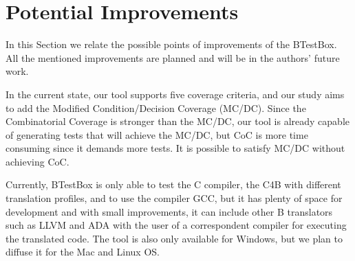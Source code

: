 \documentclass[runningheads]{llncs}
\begin{document}

\section{Potential Improvements}

In this Section we relate the possible points of improvements of the BTestBox. All the mentioned improvements are planned and will be in the authors' future work.

In the current state, our tool supports five coverage criteria, and our study aims to add the Modified Condition/Decision Coverage (MC/DC). Since the Combinatorial Coverage is stronger than the MC/DC, our tool is already capable of generating tests that will achieve the MC/DC, but CoC is more time consuming since it demands more tests. It is possible to satisfy MC/DC without achieving CoC.

Currently, BTestBox is only able to test the C compiler, the C4B with different translation profiles, and to use the compiler GCC, but it has plenty of space for development and with small improvements, it can include other B translators such as LLVM and ADA with the user of a correspondent compiler for executing the translated code. The tool is also only available for Windows, but we plan to diffuse it for the Mac and Linux OS.
\end{document}
